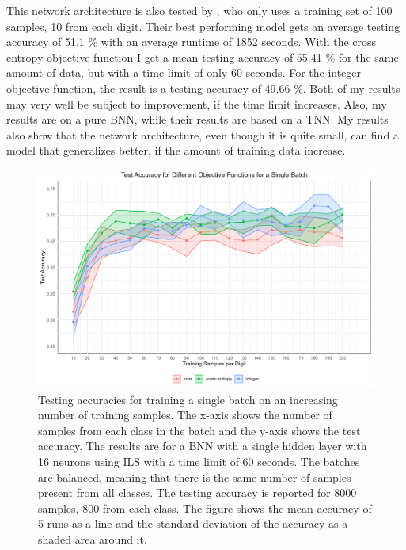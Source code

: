 \noindent This network architecture is also tested by \cite{thorbjarnason2023}, who only uses a training set of 100 samples, 10 from each digit. Their best performing model gets an average testing accuracy of 51.1 \% with an average runtime of 1852 seconds. With the cross entropy objective function I get a mean testing accuracy of 55.41 \% for the same amount of data, but with a time limit of only 60 seconds. For the integer objective function, the result is a testing accuracy of 49.66 \%. Both of my results may very well be subject to improvement, if the time limit increases. Also, my results are on a pure BNN, while their results are based on a TNN. My results also show that the network architecture, even though it is quite small, can find a model that generalizes better, if the amount of training data increase. 

\begin{figure}[H]
    \centering
    \includegraphics[width=1\linewidth]{Figures/SBT_COF.png}
    \caption{Testing accuracies for training a single batch on an increasing number of training samples. The x-axis shows the number of samples from each class in the batch and the y-axis shows the test accuracy. The results are for a BNN with a single hidden layer with 16 neurons using ILS with a time limit of 60 seconds. The batches are balanced, meaning that there is the same number of samples present from all classes. The testing accuracy is reported for 8000 samples, 800 from each class. The figure shows the mean accuracy of 5 runs as a line and the standard deviation of the accuracy as a shaded area around it. }
    \label{SBT_COF}
\end{figure}

